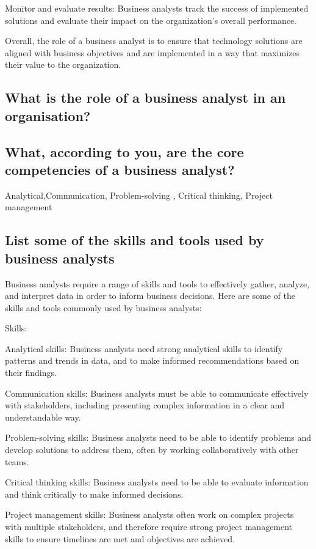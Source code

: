 \documentclass[12pt, a4paper, oneside]{article}
\begin{document}
Monitor and evaluate results: Business analysts track the success of implemented solutions and evaluate their impact on the organization's overall performance.

Overall, the role of a business analyst is to ensure that technology solutions are aligned with business objectives and are implemented in a way that maximizes their value to the organization.



\subsection{ What is the role of a business analyst in an organisation? }

\subsection{ What, according to you, are the core competencies of a business analyst? }
Analytical,Communication, Problem-solving , Critical thinking, Project management
\subsection{ List some of the skills and tools used by business analysts }
Business analysts require a range of skills and tools to effectively gather, analyze, and interpret data in order to inform business decisions. Here are some of the skills and tools commonly used by business analysts:

Skills:

Analytical skills: Business analysts need strong analytical skills to identify patterns and trends in data, and to make informed recommendations based on their findings.

Communication skills: Business analysts must be able to communicate effectively with stakeholders, including presenting complex information in a clear and understandable way.

Problem-solving skills: Business analysts need to be able to identify problems and develop solutions to address them, often by working collaboratively with other teams.

Critical thinking skills: Business analysts need to be able to evaluate information and think critically to make informed decisions.

Project management skills: Business analysts often work on complex projects with multiple stakeholders, and therefore require strong project management skills to ensure timelines are met and objectives are achieved.
\end{document}
